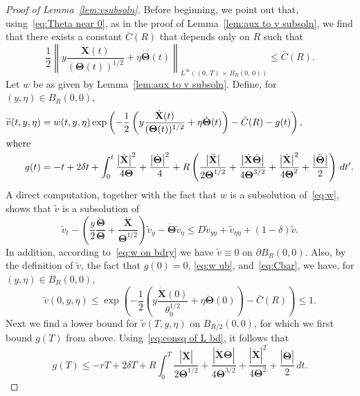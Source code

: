 \documentclass[10pt]{amsart}
\theoremstyle{definition}\newtheorem{defi}[theo]{Definition}\newtheorem{rema}[theo]{Remark}\newtheorem{exam}[theo]{Example}\newtheorem{exem}[theo]{Example}\newtheorem{nota}[theo]{Notation}
\newcommand{\bX}{\mathbf{X}}
\newcommand{\bTheta}{\boldsymbol{\Theta}}
\newcommand{\1}{\mathds{1}}
\begin{document}
\begin{proof}[Proof of Lemma~\ref{lem:vsubsoln}]
Before beginning, we point out that, using~\eqref{eq:Theta near 0}, as in the proof of Lemma~\ref{lem:aux to v subsoln}, we find that there exists a constant $\bar{C}(R)$ that depends only on $R$ such that
\begin{equation}\label{eq:Cbar}
\frac{1}{2}\left\| y \frac{\dot{\bX}(t)}{(\bTheta(t))^{1/2}} +\eta \dot{\bTheta}(t) \right\|_{L^\infty\left((0,\,T)\,\times\,B_R(0,\,0)\right)}\leq \bar C(R).
\end{equation}
Let $w$ be as given by Lemma~\ref{lem:aux to v subsoln}. Define, for $(y,\eta) \in B_R(0,0)$,
\begin{align*}
\widetilde{v}(t,y,\eta) &= w(t,y,\eta)\exp\left (-\frac{1}{2}\left(y \frac{\dot{\bX}(t)}{(\bTheta(t))^{1/2}} +\eta \dot{\bTheta}(t)\right) - \bar{C}(R) -g(t)\right),\\
\intertext{where}
g(t) &=-t+2\delta t+ \int_0^t \frac{\left|\dot{\bX}\right|^2}{4\bTheta} +\frac{\left|\dot{\bTheta}\right|^2}{4} + R\left(\frac{\left|\ddot{\bX}\right|}{2\bTheta^{1/2}}+ \frac{\left|\dot{\bX}\dot{\bTheta}\right|}{4\bTheta^{3/2}} +\frac{\left|\dot{\bX}\right|^2}{4\bTheta^2}+\frac{\left|\ddot{\bTheta}\right|}{2}\right)\, dt'.
\end{align*}
A direct computation, together with the fact that $w$ is a subsolution of~\eqref{eq:w}, shows that $\widetilde{v}$ is a subsolution of
\[
\widetilde{v}_t - \left(\frac{y}{2}\frac{\dot{\bTheta}}{\bTheta} + \frac{\dot{\bX}}{\bTheta^{1/2}}\right) \widetilde{v}_y - \dot{\bTheta} \widetilde{v}_\eta \leq D \widetilde{v}_{yy} + \widetilde{v}_{\eta\eta} + (1-\delta)\widetilde{v}.
\]
In addition, according to~\eqref{eq:w on bdry} we have $\widetilde{v}\equiv 0$ on $\partial B_R(0,0)$. Also, by the definition of $\widetilde{v}$, the fact that $g(0) = 0$, \eqref{eq:w ub}, and~\eqref{eq:Cbar}, we have, for $(y,\eta)\in B_R(0,0)$,
\[
\widetilde{v}(0,y,\eta)\leq \exp\left (-\frac{1}{2}\left(y \frac{\dot{\bX}(0)}{\theta_0^{1/2}} +\eta \dot{\bTheta}(0)\right) - \bar{C}(R) \right)\leq 1.
\]
Next we find a lower bound for $\widetilde{v}(T, y, \eta)$ on $ B_{R/2}(0,0)$, for which we first bound $g(T)$ from above. Using~\eqref{eq:consq of L bd}, it follows that
\begin{equation*}
g(T)\leq -r T+2\delta T + R\int_0^T \frac{\left|\ddot{\bX}\right|}{2\bTheta^{1/2}}+ \frac{\left|\dot{\bX}\dot{\bTheta}\right|}{4\bTheta^{3/2}} +\frac{\left|\dot{\bX}\right|^2}{4\bTheta^2}+\frac{\left|\ddot{\bTheta}\right|}{2}\, dt.
\end{equation*}

\end{proof}
\end{document}
